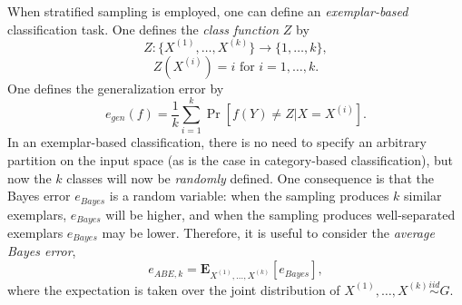 \documentclass{article}
\newcommand{\E}{\textbf{E}}
\begin{document}
When stratified sampling is employed, one can
define an \emph{exemplar-based} classification task.
One defines the \emph{class function}
$Z$ by
\[
Z: \{X^{(1)}, \hdots, X^{(k)}\} \to \{1,\hdots, k\},
\]
\[
Z(X^{(i)}) = i\text{ for }i = 1, \hdots, k.
\]
One defines the generalization error by
\begin{equation}\label{egendef}
e_{gen}(f) = \frac{1}{k} \sum_{i=1}^k\Pr[f(Y) \neq Z|X = X^{(i)}].
\end{equation}
In an exemplar-based classification, there is no need to
specify an arbitrary partition on the input space (as is the case in category-based classification),
but now the $k$ classes will now be \emph{randomly} defined.  One consequence is that
the Bayes error $e_{Bayes}$ is a random variable: when the sampling
produces $k$ similar exemplars, $e_{Bayes}$ will be higher, and when
the sampling produces well-separated exemplars $e_{Bayes}$ may be
lower.  Therefore, it is useful to consider
the \emph{average Bayes error},
\begin{equation}\label{abedef}
e_{ABE, k} = \E_{X^{(1)},\hdots, X^{(k)}}[e_{Bayes}],
\end{equation}
where the expectation is taken over the joint distribution of
$X^{(1)},\hdots, X^{(k)} \stackrel{iid}{\sim} G$.
\end{document}
